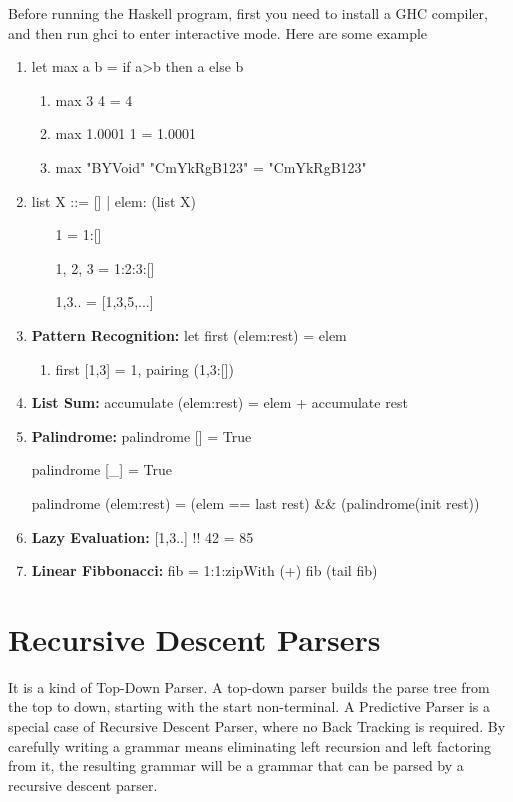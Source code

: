 \documentclass[a4paper]{article}
\theoremstyle{definition}
\begin{document}
Before running the Haskell program, first you need to install a GHC compiler, and then run ghci to enter interactive mode. Here are some example
\begin{enumerate}
    \item let max a b = if a>b then a else b
    \begin{enumerate}
        \item max 3 4 = 4
        \item max 1.0001 1 = 1.0001
        \item max "BYVoid" "CmYkRgB123" = "CmYkRgB123"
    \end{enumerate}
    \item list X ::= [] | elem: (list  X)
    \begin{enumerate}
        \item [1] = 1:[]
        \item [1, 2, 3] = 1:2:3:[]
        \item [1,3..] = [1,3,5,...]
    \end{enumerate}
    \item \textbf{Pattern Recognition:} let first (elem:rest) = elem
    \begin{enumerate}
        \item first [1,3] = 1, pairing (1,3:[])
    \end{enumerate}
    \item \textbf{List Sum:} accumulate (elem:rest) = elem + accumulate rest
    \item \textbf{Palindrome:} palindrome []  = True
    
     palindrome [\_] = True
     
     palindrome (elem:rest) = (elem == last rest) \&\& (palindrome(init rest))
     \item \textbf{Lazy Evaluation:} [1,3..] !! 42 = 85
     \item \textbf{Linear Fibbonacci:} fib = 1:1:zipWith (+) fib (tail fib)
\end{enumerate}

\section{Recursive Descent Parsers}
It is a kind of Top-Down Parser. A top-down parser builds the parse tree from the top to down, starting with the start non-terminal. A Predictive Parser is a special case of Recursive Descent Parser, where no Back Tracking is required.
By carefully writing a grammar means eliminating left recursion and left factoring from it, the resulting grammar will be a grammar that can be parsed by a recursive descent parser.
\end{document}
